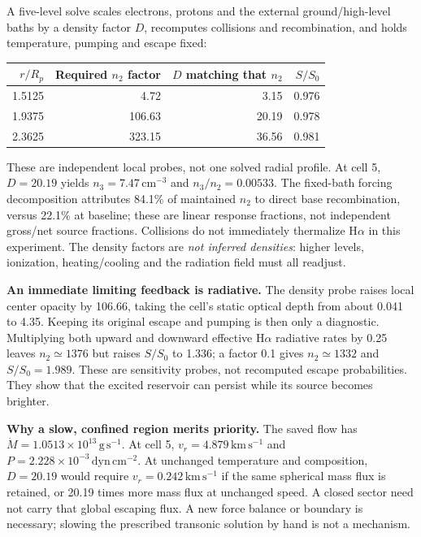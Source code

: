 \documentclass[10pt,a4paper]{article}
\begin{document}
A five-level solve scales electrons, protons and the external ground/high-level
baths by a density factor $D$, recomputes collisions and recombination, and
holds temperature, pumping and escape fixed:
\begin{center}
\begin{tabular}{rrrr}
\toprule
$r/R_p$ & Required $n_2$ factor & $D$ matching that $n_2$ & $S/S_0$ \\
\midrule
1.5125 & 4.72 & 3.15 & 0.976 \\
1.9375 & 106.63 & 20.19 & 0.978 \\
2.3625 & 323.15 & 36.56 & 0.981 \\
\bottomrule
\end{tabular}
\end{center}
These are independent local probes, not one solved radial profile. At cell 5,
$D=20.19$ yields $n_3=7.47\,\mathrm{cm}^{-3}$ and $n_3/n_2=0.00533$.
The fixed-bath forcing decomposition attributes 84.1\% of maintained $n_2$
to direct base recombination, versus 22.1\% at baseline; these are linear
response fractions, not independent gross/net source fractions.
Collisions do not immediately thermalize H$\alpha$ in this experiment.
The density factors are \emph{not inferred densities}: higher levels,
ionization, heating/cooling and the radiation field must all readjust.

\clearpage
\textbf{An immediate limiting feedback is radiative.}
The density probe raises local center opacity by 106.66, taking the cell's
static optical depth from about 0.041 to 4.35. Keeping its original escape
and pumping is then only a diagnostic. Multiplying both upward and downward
effective H$\alpha$ radiative rates by 0.25 leaves $n_2\simeq1376$ but
raises $S/S_0$ to 1.336; a factor 0.1 gives $n_2\simeq1332$ and $S/S_0=1.989$.
These are sensitivity probes, not recomputed escape probabilities. They show
that the excited reservoir can persist while its source becomes brighter.

\textbf{Why a slow, confined region merits priority.}
The saved flow has $\dot M=1.0513\times10^{13}\,\mathrm{g\,s^{-1}}$.
At cell 5, $v_r=4.879\,\mathrm{km\,s^{-1}}$ and
$P=2.228\times10^{-3}\,\mathrm{dyn\,cm^{-2}}$. At unchanged temperature
and composition, $D=20.19$ would require $v_r=0.242\,\mathrm{km\,s^{-1}}$
if the same spherical mass flux is retained, or 20.19 times more mass flux
at unchanged speed. A closed sector need not carry that global escaping flux.
A new force balance or boundary is necessary; slowing the prescribed
transonic solution by hand is not a mechanism.
\end{document}
